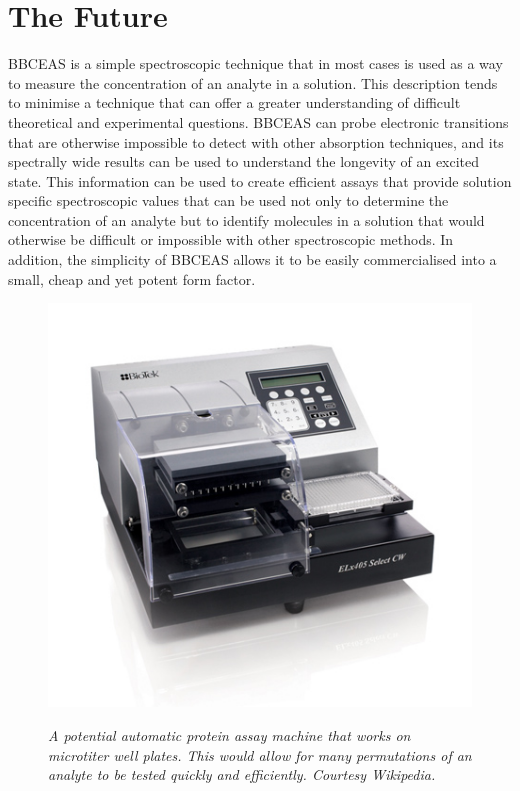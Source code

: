 \chapter{The Future} \label{ch:discussion}

\acl{BBCEAS} is a simple spectroscopic technique that in most cases is
used as a way to measure the concentration of an analyte in a solution.
This description tends to minimise a technique that can offer a greater
understanding of difficult theoretical and experimental questions. \ac{BBCEAS}
can probe electronic transitions that are otherwise impossible to detect with
other absorption techniques, and its spectrally wide results can be used to
understand the longevity of an excited state. This information can be used to
create efficient assays that provide solution specific spectroscopic values
that can be used not only to determine the concentration of an analyte but
to identify molecules in a solution that would otherwise be difficult or
impossible with other spectroscopic methods. In addition, the simplicity of
\ac{BBCEAS} allows it to be easily commercialised into a small, cheap and yet
potent form factor.

\begin{figure}
\begin{center}
\includegraphics[width=\marginspace]{figures/microtiter_machine.jpeg}
\end{center}
\emph{\footnotesize{ A potential automatic protein assay machine that works on microtiter well plates. This would allow for many permutations of an analyte to be tested quickly and efficiently. Courtesy Wikipedia.}}
\label{fig:microtiter}
\end{figure}

